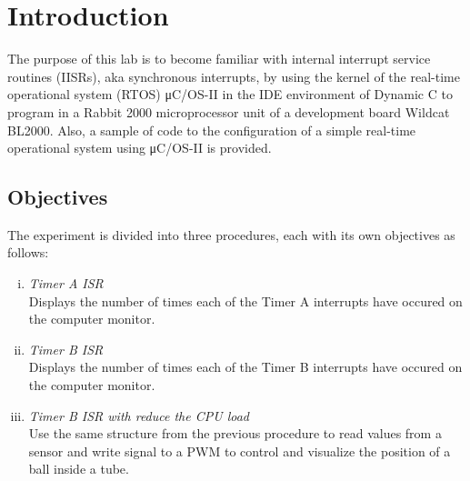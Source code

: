 \section{Introduction}

The purpose of this lab is to become familiar with internal interrupt service routines (IISRs), aka synchronous interrupts, by using the kernel of the real-time operational system (RTOS) μC/OS-II in the IDE environment of Dynamic C to program in a Rabbit 2000 microprocessor unit of a development board Wildcat BL2000. Also, a sample of code to the configuration of a simple real-time operational system using μC/OS-II is provided.

\subsection{Objectives}
The experiment is divided into three procedures, each with its own objectives as follows:

\begin{enumerate}[(i)]
\item
\textit{Timer A ISR}\\
Displays the number of times each of the Timer A interrupts have occured on the computer monitor.
\\
\item
\textit{Timer B ISR}\\
Displays the number of times each of the Timer B interrupts have occured on the computer monitor.
\\
\item
\textit{Timer B ISR with reduce the CPU load}
\\Use the same structure from the previous procedure to read values from a sensor and write signal to a PWM to control and visualize the position of a ball inside a tube.
\\
\end{enumerate}